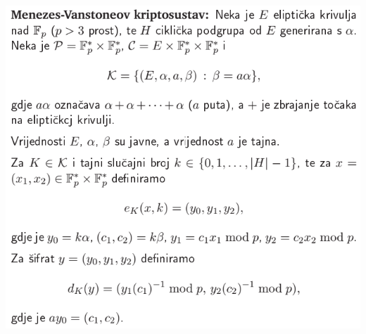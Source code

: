 \documentclass[12pt, a4paper]{article}
\begin{document}
\includegraphics[scale=0.5]{mens.png}
\end{document}
